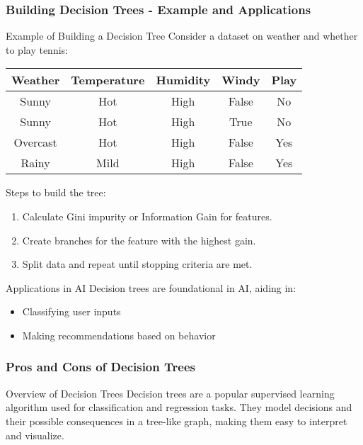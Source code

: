 \documentclass[aspectratio=169]{beamer}
\begin{document}
\begin{frame}[fragile]
    \frametitle{Building Decision Trees - Example and Applications}
    \begin{block}{Example of Building a Decision Tree}
        Consider a dataset on weather and whether to play tennis:
        
        \begin{tabular}{|c|c|c|c|c|}
            \hline
            Weather & Temperature & Humidity & Windy & Play \\
            \hline
            Sunny   & Hot         & High     & False & No   \\
            Sunny   & Hot         & High     & True  & No   \\
            Overcast& Hot         & High     & False & Yes  \\
            Rainy   & Mild        & High     & False & Yes  \\
            \hline
        \end{tabular}
        
        Steps to build the tree:
        \begin{enumerate}
            \item Calculate Gini impurity or Information Gain for features.
            \item Create branches for the feature with the highest gain.
            \item Split data and repeat until stopping criteria are met.
        \end{enumerate}
    \end{block}
    
    \begin{block}{Applications in AI}
        Decision trees are foundational in AI, aiding in:
        \begin{itemize}
            \item Classifying user inputs
            \item Making recommendations based on behavior
        \end{itemize}
    \end{block}
\end{frame}

\begin{frame}[fragile]
    \frametitle{Pros and Cons of Decision Trees}
    \begin{block}{Overview of Decision Trees}
        Decision trees are a popular supervised learning algorithm used for classification and regression tasks. They model decisions and their possible consequences in a tree-like graph, making them easy to interpret and visualize.
    \end{block}
\end{frame}
\end{document}
